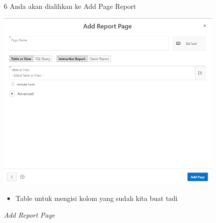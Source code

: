 \begin{itemize}
        \begin{figure}[!htbp]
        \item[6]Anda akan dialihkan ke Add Page Report
        \begin{center}
        \includegraphics[scale=0.5]{figures/menambahkan_page_report.jpg}
        \caption{\textit{Add Report Page}}
        \end{center}
        \begin{itemize}
            \item Table untuk mengisi kolom yang sudah kita buat tadi
        \end{itemize}
        \end{figure}
        

\end{itemize}
